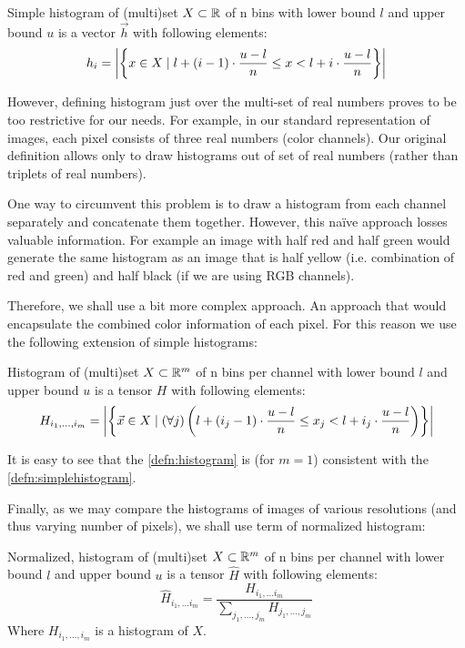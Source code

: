 \begin{defn}
\label{defn:simplehistogram}
Simple histogram of (multi)set $X \subset \mathbb{R}$ of n bins with lower bound $l$ and upper bound
$u$ is a vector $\vec{h}$ with following elements:
$$h_i = \left|{\left\{x \in X \mid l + (i-1) \cdot \frac{u-l}{n} \leq x < l + i \cdot \frac{u-l}{n}\right\}}\right|$$
\end{defn}

However, defining histogram just over the multi-set of real numbers proves to
be too restrictive for our needs. For example, in our standard representation
of images, each pixel consists of three real numbers (color channels). Our
original definition allows only to draw histograms out of set of real numbers
(rather than triplets of real numbers).

One way to circumvent this problem is to draw a histogram from each channel
separately and concatenate them together. However, this naïve approach losses
valuable information. For example an image with half red and half green
would generate the same histogram as an image that is half yellow (i.e.
combination of red and green) and half black (if we are using RGB channels).

Therefore, we shall use a bit more complex approach. An approach that would encapsulate the combined color information of each pixel. For this reason
we use the following extension of simple histograms:

\begin{defn}
\label{defn:histogram}
Histogram of (multi)set $X \subset \mathbb{R}^m$ of n bins per channel with lower bound
$l$ and upper bound $u$ is a tensor $H$ with following elements:
$$H_{i_1, \ldots, i_m} = \left|{\left\{\vec{x} \in X \mid (\forall j) \left(l + (i_j-1) \cdot \frac{u-l}{n} \leq x_j < l + i_j \cdot \frac{u-l}{n}\right)\right\}}\right|$$
\end{defn}

It is easy to see that the \autoref{defn:histogram} is (for $m = 1$)
consistent with the \autoref{defn:simplehistogram}.

Finally, as we may compare the histograms of images of various resolutions (and
thus varying number of pixels), we shall use term of normalized histogram:

\begin{defn}
\label{defn:normhistogram}
Normalized, histogram of (multi)set $X \subset \mathbb{R}^m$ of n bins per channel with
lower bound $l$ and upper bound $u$ is a tensor $\widehat{H}$ with following
elements:
$$\widehat{H}_{i_1, \ldots i_m} = \frac{H_{i_1, \ldots i_m}}{\sum_{j_1, \ldots, j_m} H_{j_1, \ldots, j_m}}$$
Where $H_{i_1, \ldots, i_m}$ is a histogram of $X$.
\end{defn}

